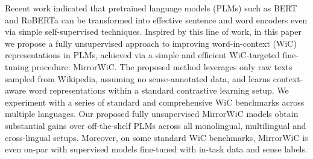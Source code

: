 Recent work indicated that pretrained language models (PLMs) such as BERT and RoBERTa can be transformed into effective sentence and word encoders even via simple self-supervised techniques. Inspired by this line of work, in this paper we propose a fully unsupervised approach to improving word-in-context (WiC) representations in PLMs, achieved via a simple and efficient WiC-targeted fine-tuning procedure: MirrorWiC. The proposed method leverages only raw texts sampled from Wikipedia, assuming no sense-annotated data, and learns context-aware word representations within a standard contrastive learning setup. We experiment with a series of standard and comprehensive WiC benchmarks across multiple languages. Our proposed fully unsupervised MirrorWiC models obtain substantial gains over off-the-shelf PLMs across all monolingual, multilingual and cross-lingual setups. Moreover, on some standard WiC benchmarks, MirrorWiC is even on-par with supervised models fine-tuned with in-task data and sense labels.
